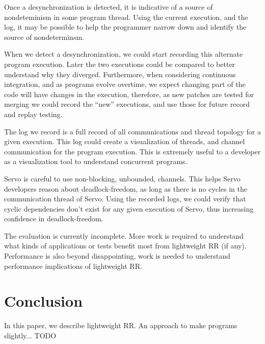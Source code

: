 \documentclass{article}
\begin{document}
Once a desynchronization is detected, it is indicative of a source of nondeteminism
in some program thread. Using the current execution, and the log, it may be possible
to help the programmer narrow down and identify the source of nondeterminsm.

When we detect a desynchronization, we could start recording this alternate program
execution. Later the two executions could be compared to better understand why
they diverged. Furthermore, when considering continuous integration, and as programs
evolve overtime, we expect changing part of the code will have changes in the execution,
therefore, as new patches are tested for merging we could record the ``new'' executions,
and use those for future record and replay testing.

The log we record is a full record of all communications and thread topology for a
given execution. This log could create a visualization of threads, and channel
communication for the program execution. This is extremely useful to a developer as
a visualization tool to understand concurrent programs.

Servo is careful to use non-blocking, unbounded, channels. This helps Servo developers
reason about deadlock-freedom, as long as there is no cycles in the communication thread
of Servo. Using the recorded logs, we could verify that cyclic dependencies don't exist
for any given execution of Servo, thus increasing confidence in deadlock-freedom.

The evaluation is currently incomplete. More work is required to understand what kinds
of applications or tests benefit most from lightweight RR (if any). Performance is also
beyond disappointing, work is needed to understand performance implications of lightweight
RR.

\section{Conclusion}
In this paper, we describe lightweight RR. An approach to make programs slightly... TODO
\end{document}
